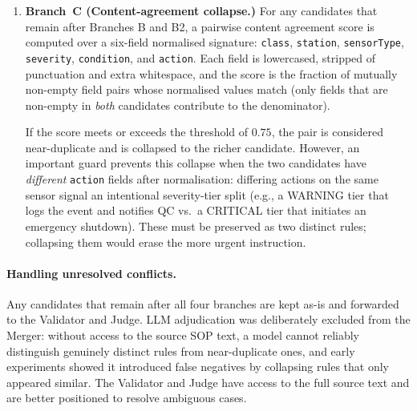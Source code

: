 ﻿\documentclass[11pt]{article}
\begin{document}
\begin{enumerate}
          When such duplicate pairs are detected, the group is collapsed to the
          \emph{most-populated} candidate, the one with the greatest number of
          non-empty fields, which is most likely to be the more complete extraction.
          The other candidates in the group are discarded.

    \item \textbf{Branch~C (Content-agreement collapse.)}
          For any candidates that remain after Branches B and B2, a pairwise content
          agreement score is computed over a six-field normalised signature:
          \texttt{class}, \texttt{station}, \texttt{sensorType}, \texttt{severity},
          \texttt{condition}, and \texttt{action}.  Each field is lowercased, stripped
          of punctuation and extra whitespace, and the score is the fraction of
          mutually non-empty field pairs whose normalised values match (only fields
          that are non-empty in \emph{both} candidates contribute to the denominator).

          If the score meets or exceeds the threshold of $0.75$, the pair is
          considered near-duplicate and is collapsed to the richer candidate.  However, an
          important guard prevents this collapse when the two candidates have
          \emph{different} \texttt{action} fields after normalisation: differing
          actions on the same sensor signal an intentional severity-tier split
          (e.g., a WARNING tier that logs the event and notifies QC vs.\ a CRITICAL
          tier that initiates an emergency shutdown).  These must be preserved as
          two distinct rules; collapsing them would erase the more urgent instruction.
\end{enumerate}

\paragraph{Handling unresolved conflicts.}
Any candidates that remain after all four branches are kept as-is and forwarded to
the Validator and Judge.  LLM adjudication was deliberately excluded from the Merger:
without access to the source SOP text, a model cannot reliably distinguish genuinely
distinct rules from near-duplicate ones, and early experiments showed it introduced
false negatives by collapsing rules that only appeared similar.  The Validator and
Judge have access to the full source text and are better positioned to resolve
ambiguous cases.

\end{document}
